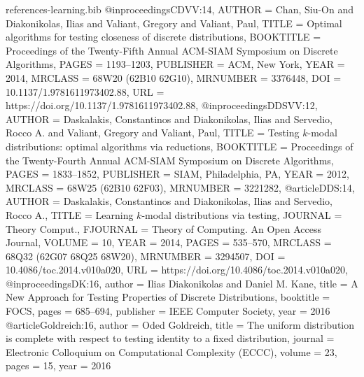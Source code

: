 \documentclass[11pt]{article}
\begin{document}
\begin{filecontents}{references-learning.bib}
@inproceedings{CDVV:14,
    AUTHOR = {Chan, Siu-On and Diakonikolas, Ilias and Valiant, Gregory and
              Valiant, Paul},
     TITLE = {Optimal algorithms for testing closeness of discrete
              distributions},
 BOOKTITLE = {Proceedings of the {T}wenty-{F}ifth {A}nnual {ACM}-{SIAM}
              {S}ymposium on {D}iscrete {A}lgorithms},
     PAGES = {1193--1203},
 PUBLISHER = {ACM, New York},
      YEAR = {2014},
   MRCLASS = {68W20 (62B10 62G10)},
  MRNUMBER = {3376448},
       DOI = {10.1137/1.9781611973402.88},
       URL = {https://doi.org/10.1137/1.9781611973402.88},
}
@inproceedings{DDSVV:12,
    AUTHOR = {Daskalakis, Constantinos and Diakonikolas, Ilias and Servedio,
              Rocco A. and Valiant, Gregory and Valiant, Paul},
     TITLE = {Testing {$k$}-modal distributions: optimal algorithms via
              reductions},
 BOOKTITLE = {Proceedings of the {T}wenty-{F}ourth {A}nnual {ACM}-{SIAM}
              {S}ymposium on {D}iscrete {A}lgorithms},
     PAGES = {1833--1852},
 PUBLISHER = {SIAM, Philadelphia, PA},
      YEAR = {2012},
   MRCLASS = {68W25 (62B10 62F03)},
  MRNUMBER = {3221282},
}
@article{DDS:14,
    AUTHOR = {Daskalakis, Constantinos and Diakonikolas, Ilias and Servedio,
              Rocco A.},
     TITLE = {Learning {$k$}-modal distributions via testing},
   JOURNAL = {Theory Comput.},
  FJOURNAL = {Theory of Computing. An Open Access Journal},
    VOLUME = {10},
      YEAR = {2014},
     PAGES = {535--570},
   MRCLASS = {68Q32 (62G07 68Q25 68W20)},
  MRNUMBER = {3294507},
       DOI = {10.4086/toc.2014.v010a020},
       URL = {https://doi.org/10.4086/toc.2014.v010a020},
}
@inproceedings{DK:16,
  author    = {Ilias Diakonikolas and
               Daniel M. Kane},
  title     = {A New Approach for Testing Properties of Discrete Distributions},
  booktitle = {{FOCS}},
  pages     = {685--694},
  publisher = {{IEEE} Computer Society},
  year      = {2016}
}
@article{Goldreich:16,
  author    = {Oded Goldreich},
  title     = {The uniform distribution is complete with respect to testing identity
               to a fixed distribution},
  journal   = {Electronic Colloquium on Computational Complexity {(ECCC)}},
  volume    = {23},
  pages     = {15},
  year      = {2016}
}


\end{filecontents}
\end{document}
